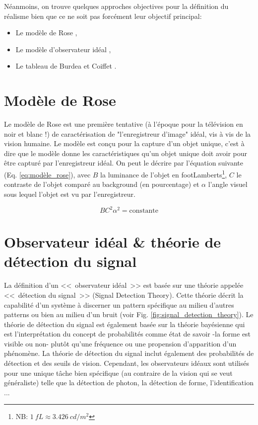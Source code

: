 	\par Néanmoins, on trouve quelques approches objectives pour la définition du réalisme bien que ce ne soit pas forcément leur objectif principal:	
		\begin{itemize}
			\item Le modèle de Rose \citep{rose_sensitivity_1948,burgess_rose_1999},
			\item Le modèle d'observateur idéal \citep{geisler_ideal_2003},
			\item Le tableau de Burdea et Coiffet \citep{burdea_realite_1993}.
		\end{itemize}
		
		\section{Modèle de Rose}		
		\par Le modèle de Rose est une première tentative (à l'époque pour la télévision en noir et blanc !) de caractérisation de "l'enregistreur d'image" idéal, vis à vis de la vision humaine. Le modèle est conçu pour la capture d'un objet unique, c'est à dire que le modèle donne les caractéristiques qu'un objet unique doit avoir pour être capturé par l'enregistreur idéal. On peut le décrire par l'équation  suivante (Eq. \ref{eq:modèle_rose}), avec $B$ la luminance de l'objet en footLamberts\footnote{NB: $1~fL \approx 3.426~cd/m^2$}, $C$ le contraste de l'objet comparé au background (en pourcentage) et $\alpha$ l'angle visuel sous lequel l'objet est vu par l'enregistreur.
		
		\begin{equation}
			BC^2\alpha^2 = \text{constante}
			\label{eq:modèle_rose} 
		\end{equation}
		
		\section{Observateur idéal \& théorie de détection du signal}		
		\par La définition d'un <<~observateur idéal~>> est basée sur une théorie appelée <<~détection du signal~>> (Signal Detection Theory). Cette théorie décrit la capabilité d'un système à discerner un pattern spécifique au milieu d'autres patterns ou bien au milieu d'un bruit (voir Fig. \ref{fig:signal_detection_theory}). Le théorie de détection du signal est également basée sur la théorie bayésienne qui est l'interprétation du concept de probabilités comme état de savoir -la forme est visible ou non- plutôt qu'une fréquence ou une propension d'apparition d'un phénomène. La théorie de détection du signal inclut également des probabilités de détection et des seuils de vision. Cependant, les observateurs idéaux sont utilisés pour une unique tâche bien spécifique (au contraire de la vision qui se veut généraliste) telle que la détection de photon, la détection de forme, l'identification ...
		
